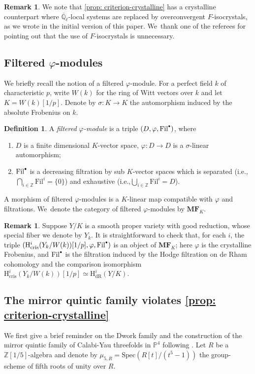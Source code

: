 \documentclass[11pt]{article}
\newcommand{\ie}{i.e.,\xspace}
\newcommand{\csbullet}{{\raisebox{1pt}{$\scriptscriptstyle\bullet$}}}
\numberwithin{equation}{subsection}
\theoremstyle{definition}
\newtheorem{defn}[thm]{Definition}
\newtheorem{rmk}[thm]{Remark}
\newcommand\Fil{\mathrm{Fil}}
\newcommand\cris{\mathrm{cris}}
\newcommand{\Qlbar}{\overline{\mathbb{Q}}_{\ell}}
\newcommand{\Z}{\mathbb Z}
\newcommand{\MF}{\mathbf{MF}}
\let\mb\mathbb
\begin{document}
\begin{rmk}
We note that \cref{prop: criterion-crystalline} has a crystalline counterpart where $\Qlbar$-local systems are replaced by overconvergent $F$-isocrystals, as we wrote in the initial version of this paper. We~thank one of the referees for pointing out that the use of $F$-isocrystals is unnecessary.
\end{rmk}

\subsection{Filtered \texorpdfstring{$\varphi$}{phi}-modules}
We briefly recall the notion of a filtered $\varphi$-module. For a perfect field $k$ of characteristic $p$, write $W(k)$ for the ring of Witt vectors over $k$ and let $K=W(k)[1/p]$. Denote by $\sigma: K\rightarrow K$ the automorphism induced by the absolute Frobenius on $k$.

\begin{defn}
A \emph{filtered $\varphi$-module} is a triple $(D, \varphi, \Fil^{\csbullet})$, where
\begin{enumerate}\renewcommand{\theenumi}{\roman{enumi}}
\item $D$ is a finite dimensional $K$-vector space, $\varphi: D\rightarrow D$ is a $\sigma$-linear automorphism;
\item $\Fil^{\csbullet}$ is a decreasing filtration by sub $K$-vector spaces which is separated (\ie $\bigcap_{i\in \mb{Z}} \Fil^i =\{0\}$) and exhaustive (\ie $\bigcup_{i\in \mb{Z}} \Fil^i=D$).
\end{enumerate}
A morphism of filtered $\varphi$-modules is a $K$-linear map compatible with $\varphi$ and filtrations. We~denote the category of filtered $\varphi$-modules by $\MF_K$.
\end{defn}

\begin{rmk}
Suppose $Y/K$ is a smooth proper variety with good reduction, whose special fiber we denote by $Y_k$. It is straightforward to check that, for each $i$, the triple $(\mathrm{H}^i_{\cris}(Y_k/W(k))[1/p], \varphi, \Fil^{\csbullet})$ is an object of $\MF_K$; here $\varphi$ is the crystalline Frobenius, and $\Fil^{\csbullet}$ is the filtration induced by the Hodge filtration on de Rham cohomology and the comparison isomorphism $\mathrm{H}^i_{\cris}(Y_k/W(k))[1/p]\simeq \mathrm{H}^i_{\mathrm{dR}}(Y/K)$.
\end{rmk}

\subsection{The mirror quintic family violates \texorpdfstring{\cref{prop: criterion-crystalline}}{the criterion}}
We first give a brief reminder on the Dwork family and the construction of the mirror quintic family of Calabi-Yau threefolds in $\mathbb{P}^4$ following \cite{Katz-Another-Look-at-the-Dwork-Family}. Let $R$ be a $\Z[1/5]$-algebra and denote by $\mu_{5,R}=\mathrm{Spec}(R[t]/(t^5-1))$ the group-scheme of fifth roots of unity over $R$.
\end{document}

